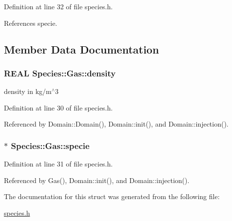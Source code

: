 Definition at line 32 of file species.h.

References specie.

\subsection{Member Data Documentation}
\hypertarget{structSpecies_1_1Gas_f135bbc6200f4e193156fe40e3d5ae21}{
\subsubsection[{density}]{\setlength{\rightskip}{0pt plus 5cm}REAL {\bf Species::Gas::density}}}
\label{structSpecies_1_1Gas_f135bbc6200f4e193156fe40e3d5ae21}


density in kg/m$^\wedge$3 



Definition at line 30 of file species.h.

Referenced by Domain::Domain(), Domain::init(), and Domain::injection().\hypertarget{structSpecies_1_1Gas_c4c1880c22066f27bff69e782b23ea24}{
\subsubsection[{specie}]{$\ast$ {\bf Species::Gas::specie}}}
\label{structSpecies_1_1Gas_c4c1880c22066f27bff69e782b23ea24}




Definition at line 31 of file species.h.

Referenced by Gas(), Domain::init(), and Domain::injection().

The documentation for this struct was generated from the following file:\begin{CompactItemize}
\item 
\hyperlink{species_8h}{species.h}\end{CompactItemize}

